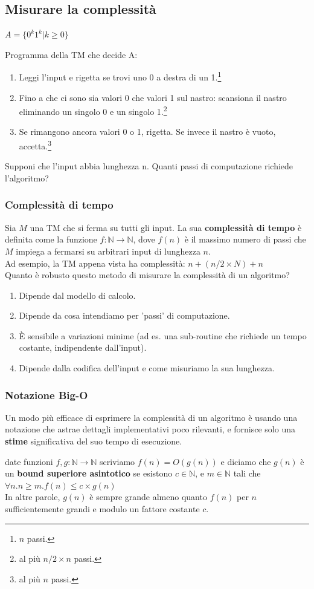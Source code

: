 \documentclass[a4paper, 12pt]{article}
\begin{document}
\subsection{Misurare la complessit\`a}
\begin{center}
$A = \{0^{k}1^{k} | k \geq 0\}$
\end{center}
Programma della TM che decide A:
\begin{enumerate}
\item Leggi l'input e rigetta se trovi uno 0 a destra di un 1.\footnote{$n$ passi.}
\item Fino a che ci sono sia valori 0 che valori 1 sul nastro: scansiona il nastro eliminando un singolo 0 e un singolo 1.\footnote{al pi\`u $n/2 \times n$ passi.}
\item Se rimangono ancora valori 0 o 1, rigetta. Se invece il nastro \`e vuoto, accetta.\footnote{al pi\`u $n$ passi.}
\end{enumerate}
Supponi che l'input abbia lunghezza n. Quanti passi di computazione richiede l'algoritmo?
\subsubsection{Complessit\`a di tempo}
Sia $M$ una TM che si ferma su tutti gli input. La sua \textbf{complessit\`a di tempo} \`e definita come la funzione $f: \mathbb{N} \rightarrow \mathbb{N}$, dove $f(n)$ \`e il massimo numero di passi che $M$ impiega a fermarsi su arbitrari input di lunghezza $n$.\\
Ad esempio, la TM appena vista ha complessit\`a: $n + (n/2 \times N) + n$\\
Quanto \`e robusto questo metodo di misurare la complessit\`a di un algoritmo?
\begin{enumerate}
\item Dipende dal modello di calcolo.
\item Dipende da cosa intendiamo per 'passi' di computazione.
\item \`E sensibile a variazioni minime (ad es. una sub-routine che richiede un tempo costante, indipendente dall'input).
\item Dipende dalla codifica dell'input e come misuriamo la sua lunghezza.
\end{enumerate}

\subsubsection{Notazione Big-O}
Un modo pi\`u efficace di esprimere la complessit\`a  di un algoritmo \`e usando una notazione che astrae dettagli implementativi poco rilevanti, e fornisce solo una \textbf{stime} significativa del suo tempo di esecuzione.
\begin{center}
date funzioni $f,g: \mathbb{N} \rightarrow \mathbb{N}$ scriviamo $f(n) = O(g(n))$ e diciamo che $g(n)$ \`e un \textbf{bound superiore asintotico} se esistono $c \in \mathbb{N}$, e $m \in \mathbb{N}$ tali che $\forall n. n \geq m. f(n) \leq c \times g(n)$\\In altre parole, $g(n)$ \`e sempre grande almeno quanto $f(n)$ per $n$ sufficientemente grandi e modulo un fattore costante $c$.
\end{center}
\end{document}
